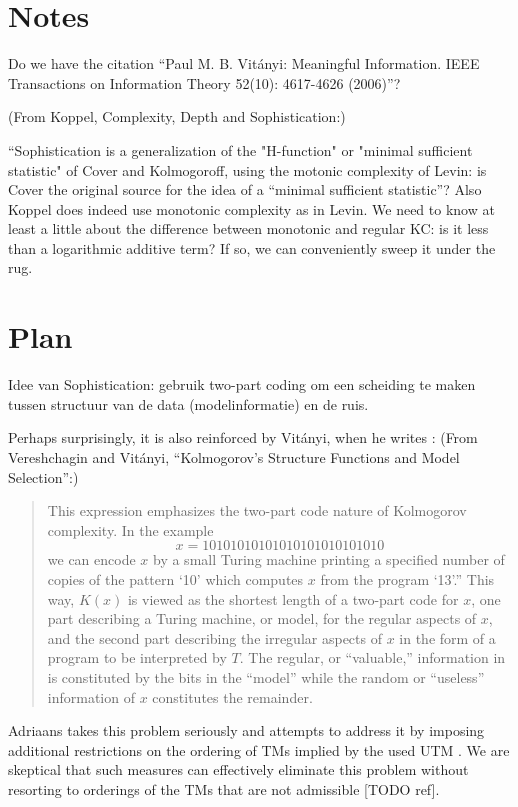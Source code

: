 \documentclass{style/llncs}
\begin{document}
\section{Notes}

Do we have the citation ``Paul M. B. Vit\'anyi: Meaningful Information. IEEE Transactions on Information Theory 52(10): 4617-4626 (2006)''?

(From Koppel, Complexity, Depth and Sophistication:)

``Sophistication is a generalization of the "H-function" or "minimal sufficient statistic" of Cover and Kolmogoroff, using the motonic complexity of Levin: is Cover the original source for the idea of a ``minimal sufficient statistic''? Also Koppel does indeed use monotonic complexity as in Levin. We need to know at least a little about the difference between monotonic and regular KC: is it less than a logarithmic additive term? If so, we can conveniently sweep it under the rug.

\section{Plan}

Idee van Sophistication: gebruik two-part coding om een scheiding te maken tussen structuur van de data (modelinformatie) en de ruis.


Perhaps surprisingly, it is also reinforced by Vit\'anyi, when he writes : (From Vereshchagin and Vit\'anyi, ``Kolmogorov’s Structure Functions and Model Selection'':)
\begin{quotation}
  This expression emphasizes the two-part code nature of Kolmogorov complexity. In the example
\[x=10101010101010101010101010\]
we can encode $x$ by a small Turing machine printing a specified number of copies of the pattern `10' which computes $x$ from the program `13'.” This way, $K(x)$ is viewed as the shortest length of a two-part code for $x$, one part describing a Turing machine, or model, for the regular aspects of $x$, and the second part describing the irregular aspects of $x$ in the form of a program to be interpreted by $T$. The regular, or “valuable,” information in  is constituted by the bits in the “model” while the random or ``useless'' information of $x$ constitutes the remainder.
\end{quotation}



Adriaans takes this problem seriously and attempts to address it by imposing additional restrictions on the ordering of TMs implied by the used UTM \cite{adriaans2012facticity}. We are skeptical that such measures can effectively eliminate this problem without resorting to orderings of the TMs that are not admissible [TODO ref].
\end{document}
